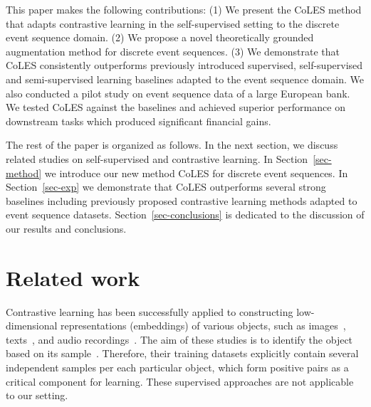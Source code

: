 \documentclass{article}
\begin{document}
This paper makes the following contributions: (1) We present the CoLES method that adapts contrastive learning in the self-supervised setting to the discrete event sequence domain. (2) We propose a novel theoretically grounded augmentation method for discrete event sequences. (3) We demonstrate that CoLES consistently outperforms previously introduced supervised, self-supervised and semi-supervised learning baselines adapted to the event sequence domain. We also conducted a pilot study on event sequence data 
of a large European bank. We tested CoLES against the baselines and achieved superior performance on downstream tasks which produced significant financial gains. %

The rest of the paper is organized as follows. In the next section, we discuss related studies on self-supervised and contrastive learning. In Section~\ref{sec-method} we introduce our new method CoLES for discrete event sequences. In Section~\ref{sec-exp} we demonstrate that CoLES outperforms several strong baselines including previously proposed contrastive learning methods adapted to event sequence datasets. Section~\ref{sec-conclusions} is dedicated to the discussion of our results and conclusions.

\section{Related work} \label{sec-rel-work}

Contrastive learning has been successfully applied to constructing low-dimensional representations (embeddings) of various objects, such as images~\citep{Chopra2005LearningAS, Schroff2015FaceNetAU}, texts~\citep{Reimers2019SentenceBERTSE}, and audio recordings~\citep{Wan2018GeneralizedEL}.
The aim of these studies is to identify the object based on its sample~\citep{Schroff2015FaceNetAU, Hu2014DiscriminativeDM, Wan2018GeneralizedEL}. Therefore, their training datasets explicitly contain several independent samples per each particular object, which form positive pairs as a critical component for learning. These supervised approaches are not applicable to our setting.
\end{document}
